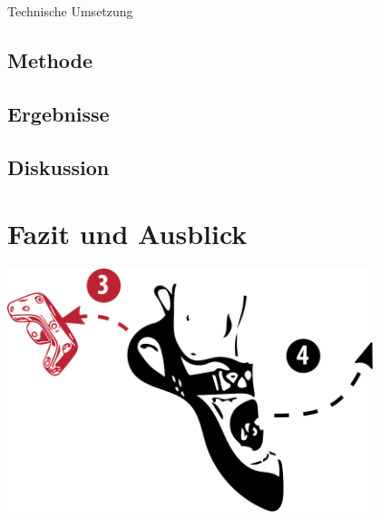 \begin{frame}{Technische Umsetzung}

\end{frame}

\subsection{Methode}
\subsection{Ergebnisse}
\subsection{Diskussion}
\section{Fazit und Ausblick}

\begin{frame}[plain]
\begin{center}
	\includegraphics[width=0.8\textwidth]{include/images/climbing-shoe-with-instructions-off.pdf}
\end{center}
\end{frame}
